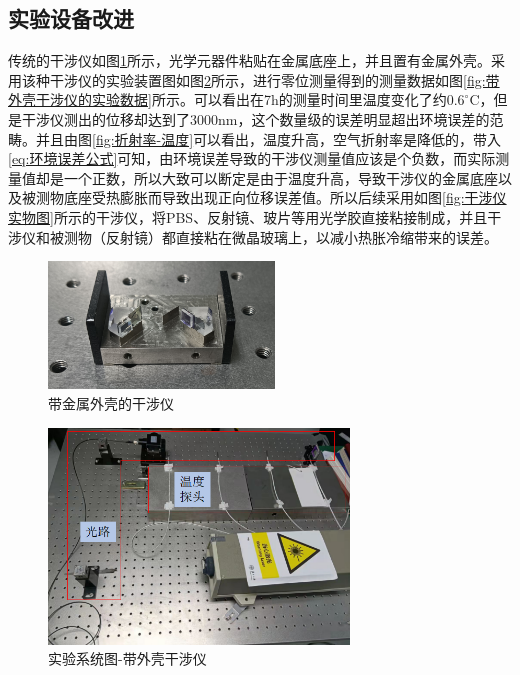 \subsection{实验设备改进}
传统的干涉仪如图\ref{fig:带金属外壳的干涉仪}所示，光学元器件粘贴在金属底座上，并且置有金属外壳。采用该种干涉仪的实验装置图如图\ref{fig:实验系统图-带外壳干涉仪}所示，进行零位测量得到的测量数据如图\ref{fig:带外壳干涉仪的实验数据}所示。可以看出在7h的测量时间里温度变化了约$0.6^{\circ} \mathrm{C}$，但是干涉仪测出的位移却达到了3000nm，这个数量级的误差明显超出环境误差的范畴。并且由图\ref{fig:折射率-温度}可以看出，温度升高，空气折射率是降低的，带入\eqref{eq:环境误差公式}可知，由环境误差导致的干涉仪测量值应该是个负数，而实际测量值却是一个正数，所以大致可以断定是由于温度升高，导致干涉仪的金属底座以及被测物底座受热膨胀而导致出现正向位移误差值。所以后续采用如图\ref{fig:干涉仪实物图}所示的干涉仪，将PBS、反射镜、玻片等用光学胶直接粘接制成，并且干涉仪和被测物（反射镜）都直接粘在微晶玻璃上，以减小热胀冷缩带来的误差。
\begin{figure}[htb]
    \centering
    \includegraphics[width=6cm]{fig/3-fig/带金属外壳的干涉仪.png}
    \caption{带金属外壳的干涉仪}
    \label{fig:带金属外壳的干涉仪}
\end{figure}
\begin{figure}[htb]
    \centering
    \includegraphics[width=8cm]{fig/3-fig/实验系统图-带外壳干涉仪.jpg}
    \caption{实验系统图-带外壳干涉仪}
    \label{fig:实验系统图-带外壳干涉仪}
\end{figure}
